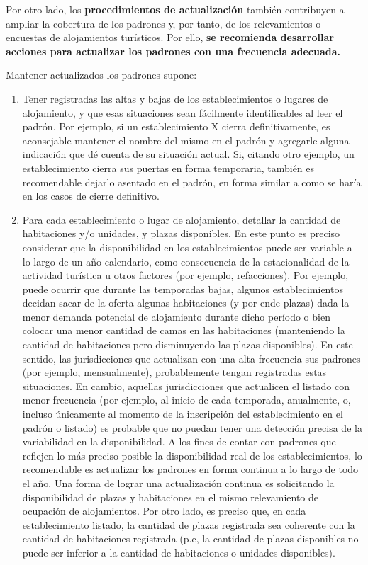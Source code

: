 \documentclass[
]{book}
\begin{document}
Por otro lado, los \textbf{procedimientos de actualización} también contribuyen a ampliar la cobertura de los padrones y, por tanto, de los relevamientos o encuestas de alojamientos turísticos. Por ello, \textbf{se recomienda desarrollar acciones para actualizar los padrones con una frecuencia adecuada.}

Mantener actualizados los padrones supone:

\begin{enumerate}
\def\labelenumi{\arabic{enumi})}
\item
  Tener registradas las altas y bajas de los establecimientos o lugares de alojamiento, y que esas situaciones sean fácilmente identificables al leer el padrón. Por ejemplo, si un establecimiento X cierra definitivamente, es aconsejable mantener el nombre del mismo en el padrón y agregarle alguna indicación que dé cuenta de su situación actual. Si, citando otro ejemplo, un establecimiento cierra sus puertas en forma temporaria, también es recomendable dejarlo asentado en el padrón, en forma similar a como se haría en los casos de cierre definitivo.
\item
  Para cada establecimiento o lugar de alojamiento, detallar la cantidad de habitaciones y/o unidades, y plazas disponibles. En este punto es preciso considerar que la disponibilidad en los establecimientos puede ser variable a lo largo de un año calendario, como consecuencia de la estacionalidad de la actividad turística u otros factores (por ejemplo, refacciones). Por ejemplo, puede ocurrir que durante las temporadas bajas, algunos establecimientos decidan sacar de la oferta algunas habitaciones (y por ende plazas) dada la menor demanda potencial de alojamiento durante dicho período o bien colocar una menor cantidad de camas en las habitaciones (manteniendo la cantidad de habitaciones pero disminuyendo las plazas disponibles). En este sentido, las jurisdicciones que actualizan con una alta frecuencia sus padrones (por ejemplo, mensualmente), probablemente tengan registradas estas situaciones. En cambio, aquellas jurisdicciones que actualicen el listado con menor frecuencia (por ejemplo, al inicio de cada temporada, anualmente, o, incluso únicamente al momento de la inscripción del establecimiento en el padrón o listado) es probable que no puedan tener una detección precisa de la variabilidad en la disponibilidad. A los fines de contar con padrones que reflejen lo más preciso posible la disponibilidad real de los establecimientos, lo recomendable es actualizar los padrones en forma continua a lo largo de todo el año. Una forma de lograr una actualización continua es solicitando la disponibilidad de plazas y habitaciones en el mismo relevamiento de ocupación de alojamientos. Por otro lado, es preciso que, en cada establecimiento listado, la cantidad de plazas registrada sea coherente con la cantidad de habitaciones registrada (p.e, la cantidad de plazas disponibles no puede ser inferior a la cantidad de habitaciones o unidades disponibles).

\end{enumerate}
\end{document}
